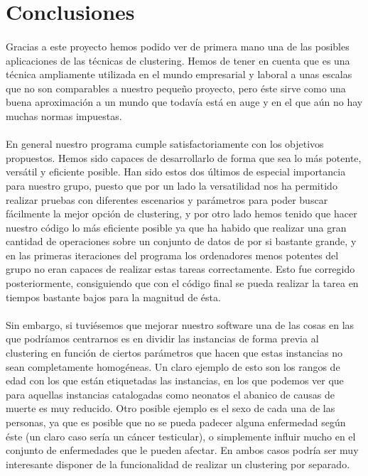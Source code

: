 \documentclass[10pt,a4paper]{article}
\begin{document}
\section{Conclusiones}
	\paragraph{}
	Gracias a este proyecto hemos podido ver de primera mano una de las posibles aplicaciones de las técnicas de clustering. Hemos de tener en cuenta que es una técnica ampliamente utilizada en el mundo empresarial y laboral a unas escalas que no son comparables a nuestro pequeño proyecto, pero éste sirve como una buena aproximación a un mundo que todavía está en auge y en el que aún no hay muchas normas impuestas. 
	\paragraph{}
	En general nuestro programa cumple satisfactoriamente con los objetivos propuestos. Hemos sido capaces de desarrollarlo de forma que sea lo más potente, versátil y eficiente posible. Han sido estos dos últimos de especial importancia para nuestro grupo, puesto que por un lado la versatilidad nos ha permitido realizar pruebas con diferentes escenarios y parámetros para poder buscar fácilmente la mejor opción de clustering, y por otro lado hemos tenido que hacer nuestro código lo más eficiente posible ya que ha habido que realizar una gran cantidad de operaciones sobre un conjunto de datos de por si bastante grande, y en las primeras iteraciones del programa los ordenadores menos potentes del grupo no eran capaces de realizar estas tareas correctamente. Esto fue corregido posteriormente, consiguiendo que con el código final se pueda realizar la tarea en tiempos bastante bajos para la magnitud de ésta.
	\paragraph{}
	Sin embargo, si tuviésemos que mejorar nuestro software una de las cosas en las que podríamos centrarnos es en dividir las instancias de forma previa al clustering en función de ciertos parámetros que hacen que estas instancias no sean completamente homogéneas. Un claro ejemplo de esto son los rangos de edad con los que están etiquetadas las instancias, en los que podemos ver que para aquellas instancias catalogadas como neonatos el abanico de causas de muerte es muy reducido. Otro posible ejemplo es el sexo de cada una de las personas, ya que es posible que no se pueda padecer alguna enfermedad según éste (un claro caso sería un cáncer testicular), o simplemente influir mucho en el conjunto de enfermedades que le pueden afectar. En ambos casos podría ser muy interesante disponer de la funcionalidad de realizar un clustering por separado.
\end{document}
